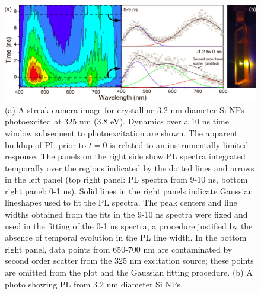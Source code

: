 \begin{figure}
\begin{center}
\includegraphics[width=\textwidth]{./Chapter6/amsi1.jpeg}
\caption[Nanosecond-scale evolution of PL from crystalline Si nanoparticles.]{(a) A streak camera image for crystalline 3.2 nm diameter Si NPs photoexcited at 325 nm (3.8 eV). Dynamics over a 10 ns time window subsequent to photoexcitation are shown. The apparent buildup of PL prior to $t = 0$ is related to an instrumentally limited response. The panels on the right side show PL spectra integrated temporally over the regions indicated by the dotted lines and arrows in the left panel (top right panel: PL spectra from 9-10 ns, bottom right panel: 0-1 ns). Solid lines in the right panels indicate Gaussian lineshapes used to fit the PL spectra. The peak centers and line widths obtained from the fits in the 9-10 ns spectra were fixed and used in the fitting of the 0-1 ns spectra, a procedure justified by the absence of temporal evolution in the PL line width. In the bottom right panel, data points from 650-700 nm are contaminated by second order scatter from the 325 nm excitation source; these points are omitted from the plot and the Gaussian fitting procedure. (b) A photo showing PL from 3.2 nm diameter Si NPs.}
\label{f:amsi1}
\end{center}
\end{figure}

